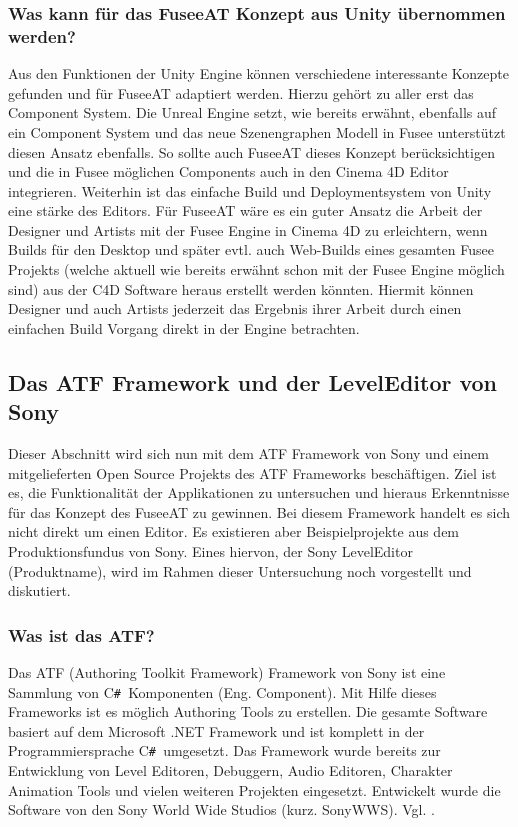 \documentclass[pagesize, paper=a4, fontsize=12pt, titlepage=true, headings=small, headnosepline, abstractoff, liststotoc, nochapterprefix, plainheadsepline, twoside]{scrreprt}
\newcommand{\CSS}{C\texttt{\# }}
\begin{document}
\subsubsection{Was kann für das FuseeAT Konzept aus Unity übernommen werden?}
Aus den Funktionen der Unity Engine können verschiedene interessante Konzepte gefunden und für FuseeAT adaptiert werden. Hierzu gehört zu aller erst das Component System. Die Unreal Engine setzt, wie bereits erwähnt, ebenfalls auf ein Component System und das neue Szenengraphen Modell in Fusee unterstützt diesen Ansatz ebenfalls. So sollte auch FuseeAT dieses Konzept berücksichtigen und die in Fusee möglichen Components auch in den Cinema 4D Editor integrieren. Weiterhin ist das einfache Build und Deploymentsystem von Unity eine stärke des Editors. Für FuseeAT wäre es ein guter Ansatz die Arbeit der Designer und Artists mit der Fusee Engine in Cinema 4D zu erleichtern, wenn Builds für den Desktop und später evtl. auch Web-Builds eines gesamten Fusee Projekts (welche aktuell wie bereits erwähnt schon mit der Fusee Engine möglich sind) aus der C4D Software heraus erstellt werden könnten. Hiermit können  Designer und auch Artists jederzeit das Ergebnis ihrer Arbeit durch einen einfachen Build Vorgang direkt in der Engine betrachten.


\subsection{Das ATF Framework und der LevelEditor von Sony}
Dieser Abschnitt wird sich nun mit dem ATF Framework von Sony und einem mitgelieferten Open Source Projekts des ATF Frameworks beschäftigen. Ziel ist es, die Funktionalität der Applikationen zu untersuchen und hieraus Erkenntnisse für das Konzept des FuseeAT zu gewinnen. Bei diesem Framework handelt es sich nicht direkt um einen Editor. Es existieren aber Beispielprojekte aus dem Produktionsfundus von Sony. Eines hiervon, der Sony LevelEditor (Produktname), wird im Rahmen dieser Untersuchung noch vorgestellt und diskutiert.

\subsubsection{Was ist das ATF?}
Das ATF (Authoring Toolkit Framework) Framework von Sony ist eine Sammlung von \CSS Komponenten (Eng. Component). Mit Hilfe dieses Frameworks ist es möglich Authoring Tools zu erstellen. Die gesamte Software basiert auf dem Microsoft .NET Framework und ist komplett in der Programmiersprache \CSS umgesetzt. Das Framework wurde bereits zur Entwicklung von Level Editoren, Debuggern, Audio Editoren, Charakter Animation Tools und vielen weiteren Projekten eingesetzt. Entwickelt wurde die Software von den Sony World Wide Studios (kurz. SonyWWS). Vgl. .
\end{document}
